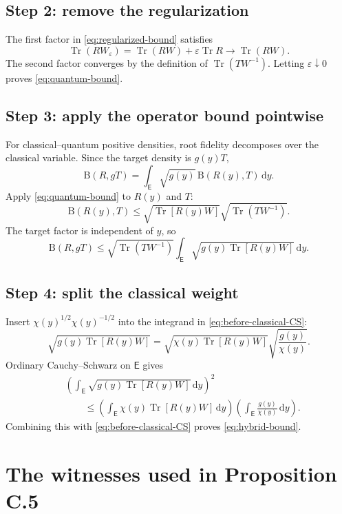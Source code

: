 \documentclass[11pt]{article}
\newcommand{\Tr}{\operatorname{Tr}}
\newcommand{\dd}{\,\mathrm d}
\newcommand{\B}{\mathrm B}
\begin{document}
\subsection*{Step 2: remove the regularization}

The first factor in \eqref{eq:regularized-bound} satisfies
\[
  \Tr(RW_\varepsilon)=\Tr(RW)+\varepsilon\Tr R
  \longrightarrow\Tr(RW).
\]
The second factor converges by the definition of $\Tr(TW^{-1})$.  Letting
$\varepsilon\downarrow0$ proves \eqref{eq:quantum-bound}.

\subsection*{Step 3: apply the operator bound pointwise}

For classical--quantum positive densities, root fidelity decomposes over the
classical variable.  Since the target density is $g(y)T$,
\[
  \B(R,gT)
  =\int_{\mathsf E}\sqrt{g(y)}\,\B(R(y),T)\dd y.
\]
Apply \eqref{eq:quantum-bound} to $R(y)$ and $T$:
\[
  \B(R(y),T)
  \leq
  \sqrt{\Tr[R(y)W]}
  \sqrt{\Tr(TW^{-1})}.
\]
The target factor is independent of $y$, so
\begin{equation}\label{eq:before-classical-CS}
  \B(R,gT)
  \leq
  \sqrt{\Tr(TW^{-1})}
  \int_{\mathsf E}
  \sqrt{g(y)\Tr[R(y)W]}\dd y.
\end{equation}

\subsection*{Step 4: split the classical weight}

Insert $\chi(y)^{1/2}\chi(y)^{-1/2}$ into the integrand in
\eqref{eq:before-classical-CS}:
\[
  \sqrt{g(y)\Tr[R(y)W]}
  =\sqrt{\chi(y)\Tr[R(y)W]}
   \sqrt{\frac{g(y)}{\chi(y)}}.
\]
Ordinary Cauchy--Schwarz on $\mathsf E$ gives
\begin{align*}
 &\left(\int_{\mathsf E}
  \sqrt{g(y)\Tr[R(y)W]}\dd y\right)^2\\
 &\qquad\leq
 \left(\int_{\mathsf E}\chi(y)\Tr[R(y)W]\dd y\right)
 \left(\int_{\mathsf E}\frac{g(y)}{\chi(y)}\dd y\right).
\end{align*}
Combining this with \eqref{eq:before-classical-CS} proves
\eqref{eq:hybrid-bound}.

\section{The witnesses used in Proposition C.5}
\end{document}
